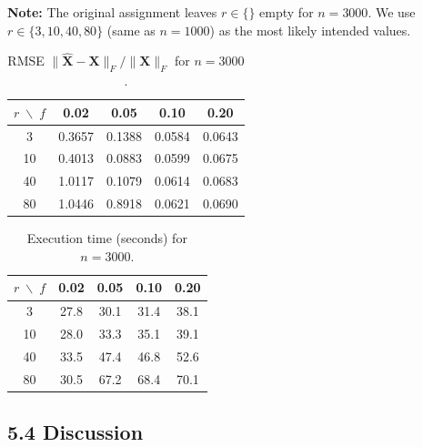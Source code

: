\documentclass[11pt]{article}
\begin{document}
\textbf{Note:} The original assignment leaves $r\in\{\}$ empty for $n=3000$.
We use $r \in \{3, 10, 40, 80\}$ (same as $n=1000$) as the most likely intended values.

\begin{table}[h!]
\centering
\caption{RMSE $\|\hat{\boldsymbol{X}}-\boldsymbol{X}\|_F/\|\boldsymbol{X}\|_F$ for $n=3000$.}
\begin{tabular}{c|cccc}
\toprule
$r \;\backslash\; f$ & 0.02 & 0.05 & 0.10 & 0.20 \\
\midrule
3  & 0.3657 & 0.1388 & 0.0584 & 0.0643 \\
10 & 0.4013 & 0.0883 & 0.0599 & 0.0675 \\
40 & 1.0117 & 0.1079 & 0.0614 & 0.0683 \\
80 & 1.0446 & 0.8918 & 0.0621 & 0.0690 \\
\bottomrule
\end{tabular}
\end{table}

\begin{table}[h!]
\centering
\caption{Execution time (seconds) for $n=3000$.}
\begin{tabular}{c|cccc}
\toprule
$r \;\backslash\; f$ & 0.02 & 0.05 & 0.10 & 0.20 \\
\midrule
3  & 27.8 & 30.1 & 31.4 & 38.1 \\
10 & 28.0 & 33.3 & 35.1 & 39.1 \\
40 & 33.5 & 47.4 & 46.8 & 52.6 \\
80 & 30.5 & 67.2 & 68.4 & 70.1 \\
\bottomrule
\end{tabular}
\end{table}

\subsection*{5.4 Discussion}
\end{document}

